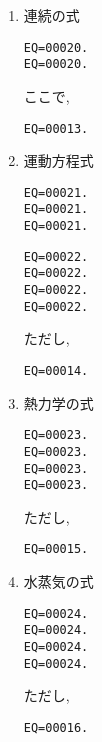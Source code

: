 \begin{enumerate}
\item 連続の式

\begin{verbatim}
EQ=00020.
EQ=00020.
\end{verbatim}
%
ここで,
\begin{verbatim}
EQ=00013.
\end{verbatim}

\item 運動方程式

\begin{verbatim}
EQ=00021.
EQ=00021.
EQ=00021.
\end{verbatim}
%
\begin{verbatim}
EQ=00022.
EQ=00022.
EQ=00022.
EQ=00022.
\end{verbatim}
%
ただし,
%
\begin{verbatim}
EQ=00014.
\end{verbatim}

\item 熱力学の式

\begin{verbatim}
EQ=00023.
EQ=00023.
EQ=00023.
EQ=00023.
\end{verbatim}
%
ただし,
%
\begin{verbatim}
EQ=00015.
\end{verbatim}



\item 水蒸気の式

\begin{verbatim}
EQ=00024.
EQ=00024.
EQ=00024.
EQ=00024.
\end{verbatim}

ただし,
%
\begin{verbatim}
EQ=00016.
\end{verbatim}



\end{enumerate}


